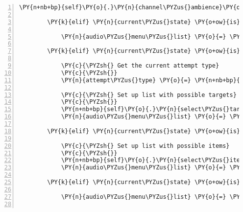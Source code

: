 \begin{Verbatim}[commandchars=\\\{\},numbers=left,firstnumber=1,stepnumber=1]
                \PY{n+nb+bp}{self}\PY{o}{.}\PY{n}{channel\PYZus{}ambience}\PY{o}{.}\PY{n}{play}\PY{p}{(}\PY{n+nb+bp}{self}\PY{o}{.}\PY{n}{room\PYZus{}ambience\PYZus{}sound}\PY{p}{,} \PY{o}{\PYZhy{}}\PY{l+m+mi}{1}\PY{p}{)}

        \PY{k}{elif} \PY{n}{current\PYZus{}state} \PY{o+ow}{is} \PY{n+nb+bp}{self}\PY{o}{.}\PY{n}{INPUT\PYZus{}STATE\PYZus{}INTERACTION}\PY{p}{:}

            \PY{n}{audio\PYZus{}menu\PYZus{}list} \PY{o}{=} \PY{n+nb+bp}{self}\PY{o}{.}\PY{n}{interaction\PYZus{}sound\PYZus{}menu}

        \PY{k}{elif} \PY{n}{current\PYZus{}state} \PY{o+ow}{is} \PY{n+nb+bp}{self}\PY{o}{.}\PY{n}{INPUT\PYZus{}STATE\PYZus{}SELECT\PYZus{}TARGET}\PY{p}{:}

            \PY{c}{\PYZsh{} Get the current attempt type}
            \PY{c}{\PYZsh{}}
            \PY{n}{attempt\PYZus{}type} \PY{o}{=} \PY{n+nb+bp}{self}\PY{o}{.}\PY{n}{interaction\PYZus{}sound\PYZus{}menu}\PY{o}{.}\PY{n}{list\PYZus{}index}

            \PY{c}{\PYZsh{} Set up list with possible targets}
            \PY{c}{\PYZsh{}}
            \PY{n+nb+bp}{self}\PY{o}{.}\PY{n}{select\PYZus{}target\PYZus{}menu}\PY{o}{.}\PY{n}{list} \PY{o}{=} \PY{n+nb+bp}{self}\PY{o}{.}\PY{n}{\PYZus{}get\PYZus{}possible\PYZus{}targets}\PY{p}{(}\PY{n}{attempt\PYZus{}type}\PY{p}{)}
            \PY{n}{audio\PYZus{}menu\PYZus{}list} \PY{o}{=} \PY{n+nb+bp}{self}\PY{o}{.}\PY{n}{select\PYZus{}target\PYZus{}menu}

        \PY{k}{elif} \PY{n}{current\PYZus{}state} \PY{o+ow}{is} \PY{n+nb+bp}{self}\PY{o}{.}\PY{n}{INPUT\PYZus{}STATE\PYZus{}SELECT\PYZus{}ITEM}\PY{p}{:}

            \PY{c}{\PYZsh{} Set up list with possible items}
            \PY{c}{\PYZsh{}}
            \PY{n+nb+bp}{self}\PY{o}{.}\PY{n}{select\PYZus{}item\PYZus{}menu}\PY{o}{.}\PY{n}{list} \PY{o}{=} \PY{n+nb+bp}{self}\PY{o}{.}\PY{n}{\PYZus{}get\PYZus{}possible\PYZus{}items}\PY{p}{(}\PY{p}{)}
            \PY{n}{audio\PYZus{}menu\PYZus{}list} \PY{o}{=} \PY{n+nb+bp}{self}\PY{o}{.}\PY{n}{select\PYZus{}item\PYZus{}menu}

        \PY{k}{elif} \PY{n}{current\PYZus{}state} \PY{o+ow}{is} \PY{n+nb+bp}{self}\PY{o}{.}\PY{n}{INPUT\PYZus{}STATE\PYZus{}CAN\PYZus{}SPEEK}\PY{p}{:}

            \PY{n}{audio\PYZus{}menu\PYZus{}list} \PY{o}{=} \PY{n+nb+bp}{self}\PY{o}{.}\PY{n}{select\PYZus{}sentence\PYZus{}menu}


\end{Verbatim}
